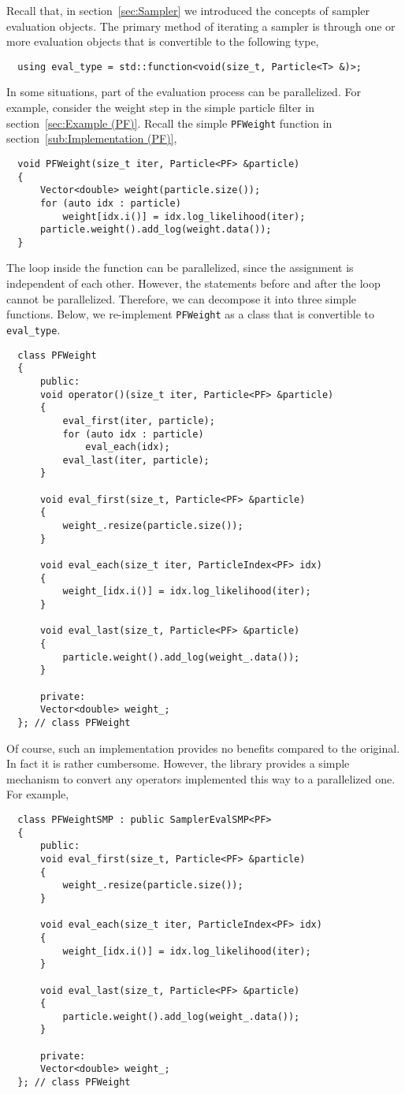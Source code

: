 Recall that, in section~\ref{sec:Sampler} we introduced the concepts of sampler
evaluation objects. The primary method of iterating a sampler is through
one or more evaluation objects that is convertible to the following type,
\begin{Verbatim}
  using eval_type = std::function<void(size_t, Particle<T> &)>;
\end{Verbatim}
In some situations, part of the evaluation process can be parallelized. For
example, consider the weight step in the simple particle filter in
section~\ref{sec:Example (PF)}. Recall the simple \verb|PFWeight| function in
section~\ref{sub:Implementation (PF)},
\begin{Verbatim}
  void PFWeight(size_t iter, Particle<PF> &particle)
  {
      Vector<double> weight(particle.size());
      for (auto idx : particle)
          weight[idx.i()] = idx.log_likelihood(iter);
      particle.weight().add_log(weight.data());
  }
\end{Verbatim}
The loop inside the function can be parallelized, since the assignment is
independent of each other. However, the statements before and after the loop
cannot be parallelized. Therefore, we can decompose it into three simple
functions. Below, we re-implement \verb|PFWeight| as a class that is
convertible to \verb|eval_type|.
\begin{Verbatim}
  class PFWeight
  {
      public:
      void operator()(size_t iter, Particle<PF> &particle)
      {
          eval_first(iter, particle);
          for (auto idx : particle)
              eval_each(idx);
          eval_last(iter, particle);
      }

      void eval_first(size_t, Particle<PF> &particle)
      {
          weight_.resize(particle.size());
      }

      void eval_each(size_t iter, ParticleIndex<PF> idx)
      {
          weight_[idx.i()] = idx.log_likelihood(iter);
      }

      void eval_last(size_t, Particle<PF> &particle)
      {
          particle.weight().add_log(weight_.data());
      }

      private:
      Vector<double> weight_;
  }; // class PFWeight
\end{Verbatim}
Of course, such an implementation provides no benefits compared to the
original. In fact it is rather cumbersome. However, the library provides a
simple mechanism to convert any operators implemented this way to a
parallelized one. For example,
\begin{Verbatim}
  class PFWeightSMP : public SamplerEvalSMP<PF>
  {
      public:
      void eval_first(size_t, Particle<PF> &particle)
      {
          weight_.resize(particle.size());
      }

      void eval_each(size_t iter, ParticleIndex<PF> idx)
      {
          weight_[idx.i()] = idx.log_likelihood(iter);
      }

      void eval_last(size_t, Particle<PF> &particle)
      {
          particle.weight().add_log(weight_.data());
      }

      private:
      Vector<double> weight_;
  }; // class PFWeight
\end{Verbatim}
